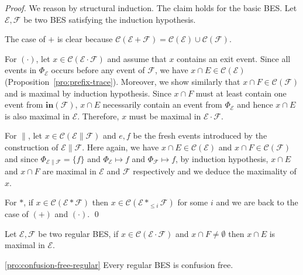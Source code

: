 \documentclass{llncs}
\newcommand{\C}{\mathcal{C}}
\newcommand{\EE}{\mathcal{E}}
\newcommand{\FF}{\mathcal{F}}
\newcommand{\init}{\mathbf{in}}
\newcommand{\<}{\langle}
\renewcommand{\>}{\rangle}
\newcommand{\exit}{\Phi}
\begin{document}
\begin{proof}
We reason by structural induction. The claim holds for the basic BES. Let $\EE,\FF$ be two BES satisfying the induction hypothesis. 

The case of $+$ is clear because $\C(\EE+\FF) =\C(\EE)\cup\C(\FF)$. 

For $(\cdot)$, let $x\in\C(\EE\cdot\FF)$ and assume that $x$ contains an exit event. Since all events in $\exit_\EE$ occurs before any event of $\FF$, we have $x\cap E\in\C(\EE)$ (Proposition~\ref{pro:prefix-trace}). Moreover, we show similarly that $x\cap F\in\C(\FF)$  and is maximal by induction hypothesis. Since $x\cap F$ must at least contain one event from $\init(\FF)$, $x\cap E$ necessarily contain an event from $\exit_\EE$ and hence $x\cap E$ is also maximal in $\EE$. Therefore, $x$ must be maximal in $\EE\cdot\FF$. 

For $\|$, let $x\in\C(\EE\|\FF)$ and $e,f$  be the fresh events introduced by the construction of $\EE\|\FF$. Here again, we have $x\cap E\in\C(\EE)$ and $x\cap F\in\C(\FF)$ and since $\exit_{\EE\|\FF} = \{f\}$ and $\exit_\EE\mapsto f$ and $\exit_\FF\mapsto f$, by induction hypothesis, $x\cap E$ and $x\cap F$ are maximal in $\EE$ and $\FF$ respectively and we deduce the maximality of $x$.

For $*$, if $x\in\C(\EE*\FF)$ then $x\in\C(\EE*_{\le i}\FF)$ for some $i$ and we are back to the case of $(+)$ and $(\cdot)$. \qed
\end{proof}

\begin{corollary}\label{pro:seq-maximal}
Let $\EE,\FF$ be two regular BES, if $x\in\C(\EE\cdot\FF)$ and $x\cap F\neq\emptyset$ then $x\cap E$ is maximal in $\EE$.
\end{corollary}

\begin{repproposition}{\ref{pro:confusion-free-regular}}
Every regular BES is confusion free.
\end{repproposition}
\end{document}
